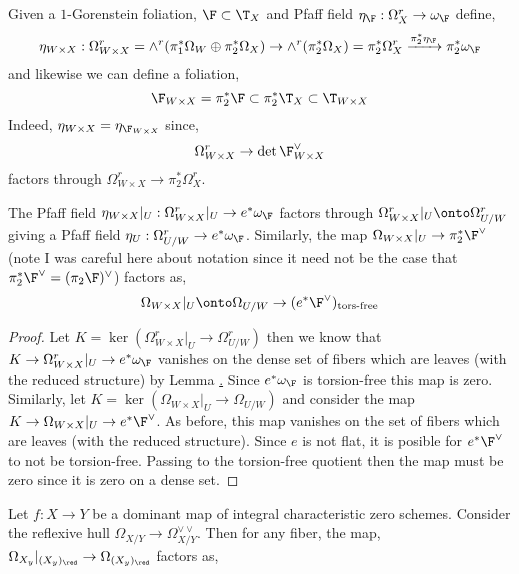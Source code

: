 \documentclass[12pt]{article}
\begin{document}
\begin{defn}
Given a $1$-Gorenstein foliation, $\F \subset \T_X$ and Pfaff field $\eta_\F : \Omega_X^r \to \omega_\F$ define,
\[ \eta_{W \times X} : \Omega^r_{W \times X} = \wedge^r (\pi_1^* \Omega_W \oplus \pi_2^* \Omega_X) \to \wedge^r (\pi_2^* \Omega_X) = \pi_2^* \Omega^r_X \xrightarrow{\pi_2^* \eta_\F} \pi_2^* \omega_{\F} \]
and likewise we can define a foliation,
\[ \F_{W \times X} = \pi_2^* \F \subset \pi_2^* \T_X \subset \T_{W \times X} \]
Indeed, $\eta_{W \times X} = \eta_{\F_{W \times X}}$ since, 
\[ \Omega_{W \times X}^r \to \det{\F_{W \times X}^\vee} \]
factors through $\Omega_{W \times X}^r \to \pi_2^* \Omega_X^r$. 
\end{defn}

\begin{lemma}
The Pfaff field $\eta_{W \times X}|_U : \Omega_{W \times X}^r|_U \to e^* \omega_{\F}$ factors through $\Omega^r_{W \times X}|_U \onto \Omega^r_{U/W}$ giving a Pfaff field $\eta_U : \Omega^r_{U/W} \to e^* \omega_{\F}$. Similarly, the map $\Omega_{W \times X}|_U \to \pi_2^* \F^\vee$ (note I was careful here about notation since it need not be the case that $\pi_2^* \F^\vee = (\pi_2 \F)^\vee$) factors as,
\[ \Omega_{W \times X}|_U \onto \Omega_{U/W} \to (e^* \F^\vee)_{\text{tors-free}} \]
\end{lemma}

\begin{proof}
Let $K = \ker{(\Omega^r_{W \times X}|_U \to \Omega^r_{U/W})}$ then we know that $K \to \Omega^r_{W \times X}|_U \to e^* \omega_{\F}$ vanishes on the dense set of fibers which are leaves (with the reduced structure) by Lemma \href{leaf_pfaff}. Since $e^* \omega_{\F}$ is torsion-free this map is zero.
\bigskip\\
Similarly, let $K = \ker{(\Omega_{W \times X}|_U \to \Omega_{U/W})}$ and consider the map $K \to \Omega_{W \times X}|_U \to e^* \F^\vee$. As before, this map vanishes on the set of fibers which are leaves (with the reduced structure). Since $e$ is not flat, it is posible for $e^* \F^\vee$ to not be torsion-free. Passing to the torsion-free quotient then the map must be zero since it is zero on a dense set. 
\end{proof}


\begin{lemma}
Let $f : X \to Y$ be a dominant map of integral characteristic zero schemes. Consider the reflexive hull $\Omega_{X/Y} \to \Omega_{X/Y}^{\vee\vee}$. Then for any fiber, the map, $\Omega_{X_y}|_{(X_y)_{\red}} \to \Omega_{(X_y)_{\red}}$ factors as,
\begin{center}
\end{center}
\end{lemma}
\end{document}
